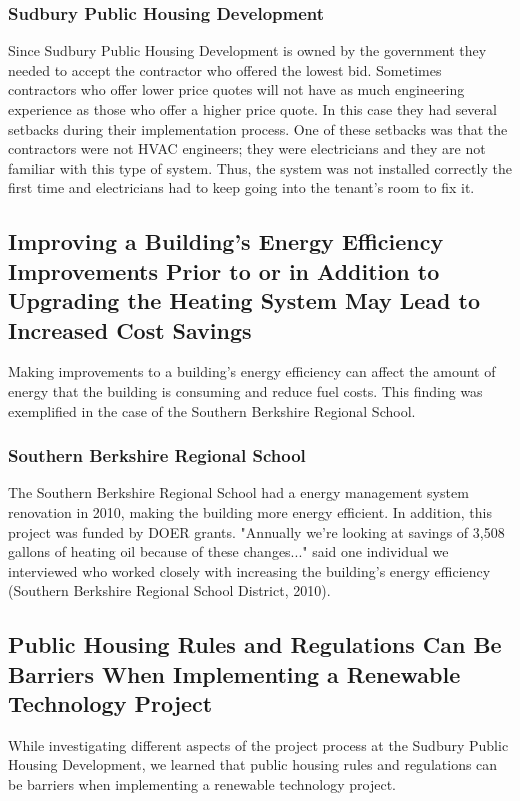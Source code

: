 \subsubsection{Sudbury Public Housing Development}
\par Since Sudbury Public Housing  Development is owned by the government they needed to accept the contractor who offered the lowest bid. Sometimes contractors who offer lower price quotes will not have as much engineering experience as those who offer a higher price quote. In this case they had several setbacks during their implementation process. One of these setbacks was that the contractors were not HVAC engineers; they were electricians and they are not familiar with this type of system. Thus, the system was not installed correctly the first time and electricians had to keep going into the tenant's room to fix it.

\subsection{Improving a Building’s Energy Efficiency Improvements Prior to or in Addition to Upgrading the Heating System May Lead to Increased Cost Savings}
\par Making improvements to a building’s energy efficiency can affect the amount of energy that the building is consuming and reduce fuel costs. This finding was exemplified in the case of the Southern Berkshire Regional School.

\subsubsection{Southern Berkshire Regional School}
\par The Southern Berkshire Regional School had a energy management system renovation in 2010, making the building more energy efficient. In addition, this project was funded by DOER grants. "Annually we’re looking at savings of 3,508 gallons of heating oil because of these changes..." said one individual we interviewed who worked closely with increasing the building’s energy efficiency (Southern Berkshire Regional School District, 2010).

\subsection{Public Housing Rules and Regulations Can Be Barriers When Implementing a Renewable Technology Project}
\par While investigating different aspects of the project process at the Sudbury Public Housing Development, we learned that public housing rules and regulations can be barriers when implementing a renewable technology project. 
